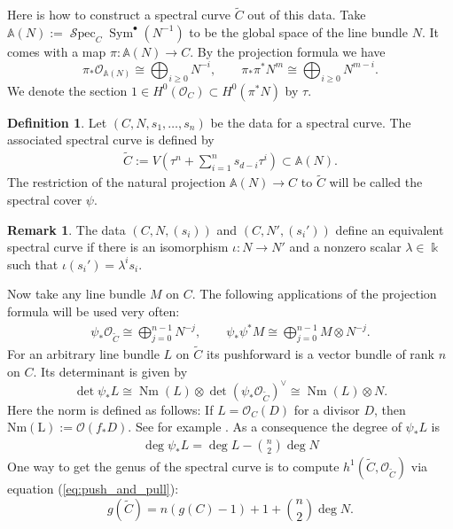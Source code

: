 \documentclass[12pt]{extarticle}
\theoremstyle{definition}
\newtheorem{definition}[theorem]{Definition}
\newtheorem{remark}[theorem]{Remark}
\numberwithin{theorem}{section}
\newcommand{\Aff}{\mathbb{A}}
\newcommand{\OO}{\mathcal{O}}
\newcommand{\op}{\operatorname}
\DeclareMathOperator{\gSpec}{\mathcal{S}pec}
\renewcommand{\tilde}{\widetilde}		%
\begin{document}
Here is how to construct a spectral curve $\tilde{C}$ out of this data.  Take $\Aff(N) := \gSpec_C\op{Sym}^\bullet(N^{-1})$ to be the global space of the line bundle $N$. It comes with a map $\pi: \Aff(N) \to C$. By the projection formula we have 
\begin{equation*}
\pi_*\OO_{\Aff(N)} \cong \bigoplus_{i\geq 0}N^{-i},\qquad \pi_*\pi^*N^m \cong \bigoplus_{i \geq 0} N^{m-i}.
\end{equation*}
We denote the section $1 \in H^0(\OO_C) \subset H^0(\pi^* N)$ by $\tau$. 
\begin{definition}
Let $(C,N,s_1,\ldots,s_n)$ be the data for a spectral curve. The associated spectral curve is defined by 
\begin{align*}
\tilde{C} := V(\tau^n + \sum_{i=1}^n s_{d-i}\tau^i) \subset \Aff(N).
\end{align*}
The restriction of the natural projection $\Aff(N) \rightarrow C$ to $\tilde{C}$ will be called the spectral cover $\psi$.
\end{definition}
\begin{remark}
 The data $(C,N,(s_i))$ and $(C,N',(s_i'))$ define an equivalent spectral curve if there is an isomorphism $\iota: N \rightarrow N'$ and a nonzero scalar $\lambda \in \Bbbk$ such that $\iota(s_i') = \lambda^i s_i$.
\end{remark}
 Now take any line bundle $M$ on $C$. The following applications of the projection formula will be used very often:
\begin{align}\label{eq:push_and_pull}
\psi_*\OO_{\tilde{C}} \cong \bigoplus_{j=0}^{n-1}N^{-j},\qquad\psi_*\psi^*M\cong  \bigoplus_{j=0}^{n-1} M \otimes N^{-j}.
\end{align}
For an arbitrary line bundle $L$ on $\tilde{C}$ its pushforward is a vector bundle of rank $n$ on $C$. Its determinant is given by
\begin{equation}\label{eq:push_and_det}
\det \psi_* L \cong \op{Nm}(L) \otimes \det(\psi_*\OO_{\tilde{C}})^\vee \cong \op{Nm}(L)\otimes N.
\end{equation}
Here the norm is defined as follows: If $L = \OO_C(D)$ for a divisor $D$, then $\op{Nm(L)}:= \OO(f_*D)$. See for example \cite[IV, Exercise 2.6]{Hartshorne}. As a consequence the degree of $\psi_*L$ is
\begin{align}\label{eq:deg_push}
\deg \psi_*L =\deg L - \binom{n}{2}\deg N 
\end{align}
One way to get the genus of the spectral curve is to compute $h^1(\tilde{C},\OO_{\tilde{C}})$ via equation (\ref{eq:push_and_pull}):
\begin{equation}
g(\tilde{C}) = n(g(C) -1) + 1 + \binom{n}{2}\deg N.
\end{equation}
\end{document}
